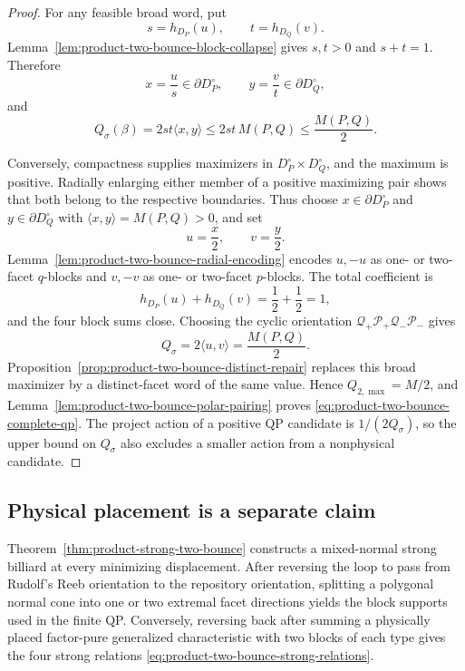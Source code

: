 \begin{unverified}
\begin{proof}
For any feasible broad word, put
\[
 s=h_{D_P}(u),\qquad t=h_{D_Q}(v).
\]
Lemma~\ref{lem:product-two-bounce-block-collapse} gives
\(s,t>0\) and \(s+t=1\).  Therefore
\[
 x=\frac{u}{s}\in\partial D_P^\circ,\qquad
 y=\frac{v}{t}\in\partial D_Q^\circ,
\]
and
\[
 Q_\sigma(\beta)
 =2st\langle x,y\rangle
 \leq2st\,M(P,Q)
 \leq\frac{M(P,Q)}2.
\]

Conversely, compactness supplies maximizers in
\(D_P^\circ\times D_Q^\circ\), and the maximum is positive.  Radially
enlarging either member of a positive maximizing pair shows that both belong
to the respective boundaries.  Thus choose
\(x\in\partial D_P^\circ\) and \(y\in\partial D_Q^\circ\) with
\(\langle x,y\rangle=M(P,Q)>0\), and set
\[
 u=\frac{x}{2},\qquad v=\frac{y}{2}.
\]
Lemma~\ref{lem:product-two-bounce-radial-encoding} encodes
\(u,-u\) as one- or two-facet \(q\)-blocks and \(v,-v\) as one- or
two-facet \(p\)-blocks.  The total coefficient is
\[
 h_{D_P}(u)+h_{D_Q}(v)=\frac12+\frac12=1,
\]
and the four block sums close.  Choosing the cyclic orientation
\(\mathcal Q_+\mathcal P_+\mathcal Q_-\mathcal P_-\) gives
\[
 Q_\sigma=2\langle u,v\rangle=\frac{M(P,Q)}2.
\]
Proposition~\ref{prop:product-two-bounce-distinct-repair} replaces this broad
maximizer by a distinct-facet word of the same value.  Hence
\(Q_{2,\max}=M/2\), and
Lemma~\ref{lem:product-two-bounce-polar-pairing} proves
\eqref{eq:product-two-bounce-complete-qp}.  The project action of a positive
QP candidate is \(1/(2Q_\sigma)\), so the upper bound on \(Q_\sigma\)
also excludes a smaller action from a nonphysical candidate.
\end{proof}
\end{unverified}

\subsection{Physical placement is a separate claim}
\label{subsec:product-two-bounce-physical-placement}

Theorem~\ref{thm:product-strong-two-bounce} constructs a mixed-normal strong
billiard at every minimizing displacement.  After reversing the loop to pass
from Rudolf's Reeb orientation to the repository orientation, splitting a
polygonal normal cone into one or two extremal facet directions yields the
block supports used in the finite QP.  Conversely, reversing back after
summing a physically placed factor-pure generalized characteristic with two
blocks of each type gives the four strong relations
\eqref{eq:product-two-bounce-strong-relations}.

